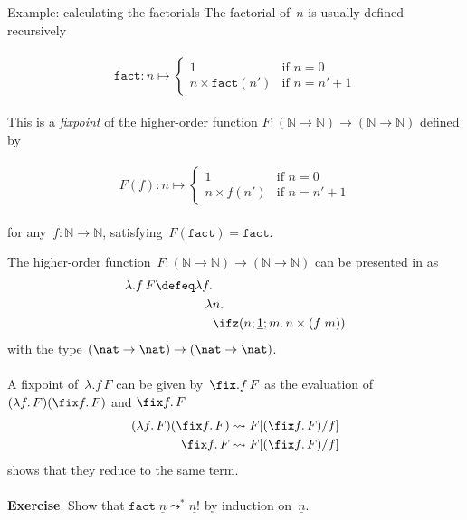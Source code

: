 \begin{frame}{Example: calculating the factorials}
  The factorial of~$n$ is usually defined recursively\\~\\
  \[
    \mathtt{fact}\colon n \mapsto
    \begin{cases}
      1 & \text{if } n = 0 \\
      n \times \mathtt{fact}(n') & \text{if } n = n' + 1
    \end{cases}
  \]
  ~\\
  This is a \emph{fixpoint} of the higher-order function
  $F\colon {(\mathbb{N}\to\mathbb{N})} \to {(\mathbb{N}\to\mathbb{N})}$ defined
  by \\~\\
  \[
    \label{eq:factorial_informal}
    F(f)\colon n \mapsto
    \begin{cases}
      1 & \text{if } n = 0 \\
      n \times f(n') & \text{if } n = n' + 1
    \end{cases}
  \]
  ~\\
  for any~$f\colon\mathbb{N}\to\mathbb{N}$, satisfying~$F(\mathtt{fact})
  =\mathtt{fact}$.
\end{frame}

\begin{frame}
  The higher-order function~$F\colon (\mathbb{N}\to\mathbb{N})
  \to(\mathbb{N}\to\mathbb{N})$ can be presented in \PCF{} as  
  \begin{align*}
    \lambda. f\, F \defeq \lambda f. & \\
    \lambda & n.\\
    & \ifz(n; \underline{1}; m.\,n\times (f\; m))
  \end{align*}
  with the type $(\nat\to\nat)\to(\nat\to\nat)$.
  \\~\\
  A fixpoint of~$\lambda. f\, F$ can be given by~$\fix. f\, F$ as the
  evaluation of~$(\lambda f.\, F)(\fix f.\, F)$ and $\fix f.\, F$ 
  \begin{align*}
    (\lambda f.\, F)(\fix f.\,F)
    & \leadsto F[(\fix f.\,F)/f] \\
    \fix f.\, F & \leadsto F[(\fix f.\, F)/ f]
  \end{align*}
  shows that they reduce to the same term. 
  \\~\\
  \textbf{Exercise}. Show that $\mathtt{fact}\;\underline{n}
  \leadsto^*\underline{n!}$ by induction on~$\underline{n}$. 
\end{frame}


